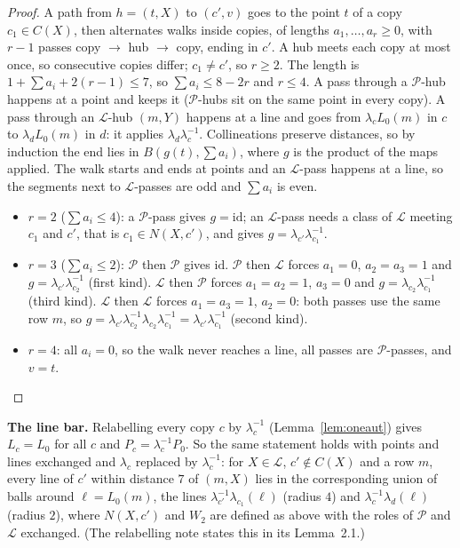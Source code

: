 \documentclass[11pt]{amsart}
\theoremstyle{plain}
\theoremstyle{definition}
\theoremstyle{remark}
\newcommand{\cP}{\mathcal{P}}
\newcommand{\cL}{\mathcal{L}}
\begin{document}
\begin{proof}
A path from $h = (t,X)$ to $(c',v)$ goes to the point $t$ of a copy $c_1 \in C(X)$, then alternates walks inside copies,
of lengths $a_1, \dots, a_r \ge 0$, with $r-1$ passes copy $\to$ hub $\to$ copy, ending in $c'$. A hub meets each copy at
most once, so consecutive copies differ; $c_1 \ne c'$, so $r \ge 2$. The length is $1 + \sum a_i + 2(r-1) \le 7$, so
$\sum a_i \le 8 - 2r$ and $r \le 4$. A pass through a $\cP$-hub happens at a point and keeps it ($\cP$-hubs sit on the
same point in every copy). A pass through an $\cL$-hub $(m,Y)$ happens at a line and goes from $\lambda_cL_0(m)$ in $c$ to
$\lambda_dL_0(m)$ in $d$: it applies $\lambda_d\lambda_c^{-1}$. Collineations preserve distances, so by induction the
end lies in $B(g(t), \sum a_i)$, where $g$ is the product of the maps applied. The walk starts and ends at points and an
$\cL$-pass happens at a line, so the segments next to $\cL$-passes are odd and $\sum a_i$ is even.
\begin{itemize}[leftmargin=1.5em]
\item $r = 2$ ($\sum a_i \le 4$): a $\cP$-pass gives $g = \mathrm{id}$; an $\cL$-pass needs a class of $\cL$ meeting
  $c_1$ and $c'$, that is $c_1 \in N(X,c')$, and gives $g = \lambda_{c'}\lambda_{c_1}^{-1}$.
\item $r = 3$ ($\sum a_i \le 2$): $\cP$ then $\cP$ gives $\mathrm{id}$. $\cP$ then $\cL$ forces $a_1 = 0$,
  $a_2 = a_3 = 1$ and $g = \lambda_{c'}\lambda_{c_2}^{-1}$ (first kind). $\cL$ then $\cP$ forces $a_1 = a_2 = 1$,
  $a_3 = 0$ and $g = \lambda_{c_2}\lambda_{c_1}^{-1}$ (third kind). $\cL$ then $\cL$ forces $a_1 = a_3 = 1$, $a_2 = 0$:
  both passes use the same row $m$, so $g = \lambda_{c'}\lambda_{c_2}^{-1}\lambda_{c_2}\lambda_{c_1}^{-1} =
  \lambda_{c'}\lambda_{c_1}^{-1}$ (second kind).
\item $r = 4$: all $a_i = 0$, so the walk never reaches a line, all passes are $\cP$-passes, and $v = t$.\qedhere
\end{itemize}
\end{proof}

\noindent\textbf{The line bar.} Relabelling every copy $c$ by $\lambda_c^{-1}$ (Lemma~\ref{lem:oneaut}) gives
$L_c = L_0$ for all $c$ and $P_c = \lambda_c^{-1}P_0$. So the same statement holds with points and lines exchanged and
$\lambda_c$ replaced by $\lambda_c^{-1}$: for $X \in \cL$, $c' \notin C(X)$ and a row $m$, every line of $c'$ within
distance $7$ of $(m,X)$ lies in the corresponding union of balls around $\ell = L_0(m)$, the lines
$\lambda_{c'}^{-1}\lambda_{c_1}(\ell)$ (radius $4$) and $\lambda_c^{-1}\lambda_d(\ell)$ (radius $2$), where $N(X,c')$ and
$W_2$ are defined as above with the roles of $\cP$ and $\cL$ exchanged. (The relabelling note states this in its
Lemma~2.1.)
\end{document}
